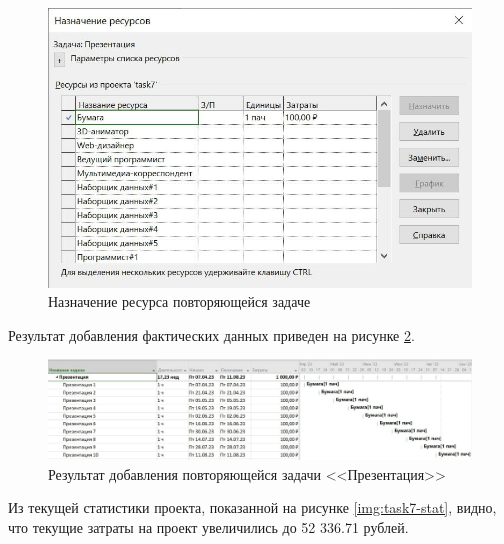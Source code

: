 \begin{figure}[H]
	\begin{center}
		\includegraphics[scale=0.25]{inc/img/task7-alignment-paper.jpg}
	\end{center}
	\captionsetup{justification=centering}
	\caption{Назначение ресурса повторяющейся задаче}
	\label{img:task7-alignment}
\end{figure}

Результат добавления фактических данных приведен на рисунке \ref{img:task7-result}.

\begin{figure}[H]
	\begin{center}
		\includegraphics[scale=0.25]{inc/img/task7-result.jpg}
	\end{center}
	\captionsetup{justification=centering}
	\caption{Результат добавления повторяющейся задачи <<Презентация>>}
	\label{img:task7-result}
\end{figure}

Из текущей статистики проекта, показанной на рисунке \ref{img:task7-stat}, видно, что текущие затраты на проект увеличились до 52 336.71 рублей.

